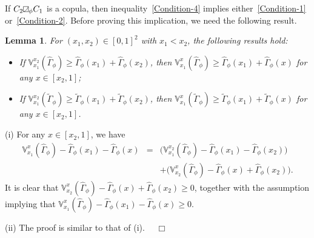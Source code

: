 \documentclass[12pt]{article}
\renewenvironment{proof}{\noindent{\bf Proof.}}{~~$\Box$}
\theoremstyle{plain}
\newtheorem{lemm}[thrm]{Lemma}%
\theoremstyle{definition}
\newcommand{\MySs}{
\begin{tikzpicture}[baseline]
\draw (0,0em) -- (0em,0.6em) -- (0.6em,0.6em) -- (0.6em,0em) -- (0,0em);
\draw (0,0em) parabola (0.6em, 0.6em);
\end{tikzpicture}}
\begin{document}
If $C_2\MySs_\phi C_1$ is a copula, then inequality~\eqref{Condition-4} implies either~\eqref{Condition-1} or~\eqref{Condition-2}. Before proving this implication, we need the following result.

\begin{lemm}\label{lemm-condition}
For $(x_1, x_2)\in[0, 1]^2$ with $x_1<x_2$, the following results hold:
\begin{itemize}\setlength{\itemindent}{10pt}
\item[{\rm (i)}] If $\mathbb{V}_{x_1}^{x_2}(\hat{\Gamma}_\phi)\geq\hat{\Gamma}_\phi(x_1)+\hat{\Gamma}_\phi(x_2)$, then  $\mathbb{V}_{x_1}^{x}(\hat{\Gamma}_\phi)\geq\hat{\Gamma}_\phi(x_1)+\hat{\Gamma}_\phi(x)$ for any $x\in [x_2, 1]$;
\item[{\rm (ii)}] If $\mathbb{V}_{x_1}^{x_2}(\tilde{\Gamma}_\phi)\geq\tilde{\Gamma}_\phi(x_1)+\tilde{\Gamma}_\phi(x_2)$, then $\mathbb{V}_{x_1}^{x}(\tilde{\Gamma}_\phi)\geq\tilde{\Gamma}_\phi(x_1)+\tilde{\Gamma}_\phi(x)$ for any $x\in [x_2, 1]$.
\end{itemize}
\end{lemm}
\begin{proof}
(i) For any $x\in [x_2, 1]$, we have
\begin{eqnarray*}
\mathbb{V}_{x_1}^{x}(\hat{\Gamma}_\phi)-\hat{\Gamma}_\phi(x_1)-\hat{\Gamma}_\phi(x)
&=&\Big(\mathbb{V}_{x_1}^{x_2}(\hat{\Gamma}_\phi)-\hat{\Gamma}_\phi(x_1)-\hat{\Gamma}_\phi(x_2)\Big)\\
&&+\Big(\mathbb{V}_{x_2}^{x}(\hat{\Gamma}_\phi)-\hat{\Gamma}_\phi(x)+\hat{\Gamma}_\phi(x_2)\Big).
\end{eqnarray*}
It is clear that $\mathbb{V}_{x_2}^{x}(\hat{\Gamma}_\phi)-\hat{\Gamma}_\phi(x)+\hat{\Gamma}_\phi(x_2)\geq 0$, together with the assumption implying that
$\mathbb{V}_{x_1}^{x}(\hat{\Gamma}_\phi)-\hat{\Gamma}_\phi(x_1)-\hat{\Gamma}_\phi(x)\geq 0$.

(ii) The proof is similar to that of (i).
\end{proof}
\end{document}
